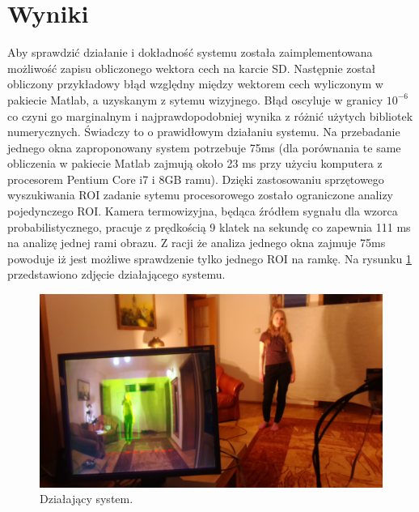 \section{Wyniki}
Aby sprawdzić działanie i dokładność systemu została zaimplementowana możliwość zapisu obliczonego wektora cech na karcie SD. 
Następnie został obliczony przykładowy błąd względny między wektorem cech wyliczonym w pakiecie Matlab, a uzyskanym z sytemu wizyjnego. %
Błąd oscyluje w granicy \(10^{-6}\) co czyni go marginalnym i najprawdopodobniej wynika z różnić użytych bibliotek numerycznych. Świadczy to o prawidłowym działaniu systemu.
Na przebadanie jednego okna zaproponowany system potrzebuje 75ms  (dla porównania te same obliczenia w pakiecie Matlab zajmują około 23 ms przy użyciu komputera z procesorem Pentium Core i7 i 8GB ramu).
Dzięki zastosowaniu sprzętowego wyszukiwania ROI zadanie sytemu procesorowego zostało ograniczone analizy pojedynczego ROI.  %
Kamera termowizyjna, będąca źródłem sygnału dla wzorca probabilistycznego, pracuje z prędkością 9 klatek na sekundę co zapewnia 111 ms na analizę jednej rami obrazu. Z racji że analiza jednego okna zajmuje 75ms powoduje iż jest możliwe sprawdzenie tylko jednego ROI na ramkę. Na rysunku \ref{fig:workingSystem} przedstawiono zdjęcie działającego systemu.

\begin{figure}
\centering
\includegraphics[width=0.8\linewidth]{images/workingSystem.jpg}
\caption[Działający system.]{Działający system.}
\label{fig:workingSystem}
\end{figure}

